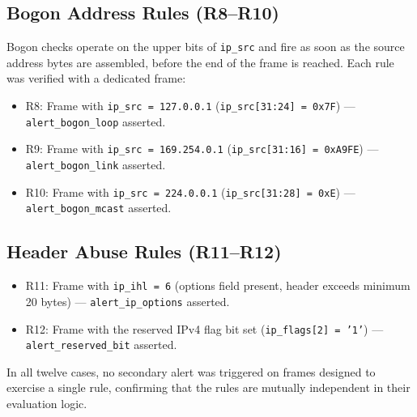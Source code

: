 \documentclass[12pt, a4paper]{report}
\begin{document}
\subsection*{Bogon Address Rules (R8--R10)}
Bogon checks operate on the upper bits of \texttt{ip\_src} and fire as soon
as the source address bytes are assembled, before the end of the frame is
reached. Each rule was verified with a dedicated frame:
\begin{itemize}
    \item R8: Frame with \texttt{ip\_src = 127.0.0.1}
          (\texttt{ip\_src[31:24] = 0x7F}) ---
          \texttt{alert\_bogon\_loop} asserted.
    \item R9: Frame with \texttt{ip\_src = 169.254.0.1}
          (\texttt{ip\_src[31:16] = 0xA9FE}) ---
          \texttt{alert\_bogon\_link} asserted.
    \item R10: Frame with \texttt{ip\_src = 224.0.0.1}
           (\texttt{ip\_src[31:28] = 0xE}) ---
           \texttt{alert\_bogon\_mcast} asserted.
\end{itemize}

\subsection*{Header Abuse Rules (R11--R12)}
\begin{itemize}
    \item R11: Frame with \texttt{ip\_ihl = 6} (options field present,
          header exceeds minimum 20 bytes) ---
          \texttt{alert\_ip\_options} asserted.
    \item R12: Frame with the reserved IPv4 flag bit set
          (\texttt{ip\_flags[2] = '1'}) ---
          \texttt{alert\_reserved\_bit} asserted.
\end{itemize}

In all twelve cases, no secondary alert was triggered on frames designed
to exercise a single rule, confirming that the rules are mutually independent
in their evaluation logic.

%

%
\end{document}

